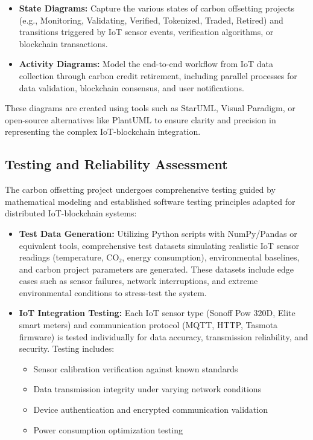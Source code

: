 \documentclass[oneside,a4paper,12pt]{book}
\begin{document}
\begin{appendices}
\begin{itemize}[leftmargin=*]
\item \textbf{State Diagrams:} Capture the various states of carbon offsetting projects (e.g., Monitoring, Validating, Verified, Tokenized, Traded, Retired) and transitions triggered by IoT sensor events, verification algorithms, or blockchain transactions.

\item \textbf{Activity Diagrams:} Model the end-to-end workflow from IoT data collection through carbon credit retirement, including parallel processes for data validation, blockchain consensus, and user notifications.
\end{itemize}

These diagrams are created using tools such as StarUML, Visual Paradigm, or open-source alternatives like PlantUML to ensure clarity and precision in representing the complex IoT-blockchain integration.

\subsection{Testing and Reliability Assessment}
The carbon offsetting project undergoes comprehensive testing guided by mathematical modeling and established software testing principles adapted for distributed IoT-blockchain systems:

\begin{itemize}[leftmargin=*]
\item \textbf{Test Data Generation:} Utilizing Python scripts with NumPy/Pandas or equivalent tools, comprehensive test datasets simulating realistic IoT sensor readings (temperature, CO₂, energy consumption), environmental baselines, and carbon project parameters are generated. These datasets include edge cases such as sensor failures, network interruptions, and extreme environmental conditions to stress-test the system.

\item \textbf{IoT Integration Testing:} Each IoT sensor type (Sonoff Pow 320D, Elite smart meters) and communication protocol (MQTT, HTTP, Tasmota firmware) is tested individually for data accuracy, transmission reliability, and security. Testing includes:
\begin{itemize}
\item Sensor calibration verification against known standards
\item Data transmission integrity under varying network conditions  
\item Device authentication and encrypted communication validation
\item Power consumption optimization testing
\end{itemize}


\end{itemize}
\end{appendices}
\end{document}

